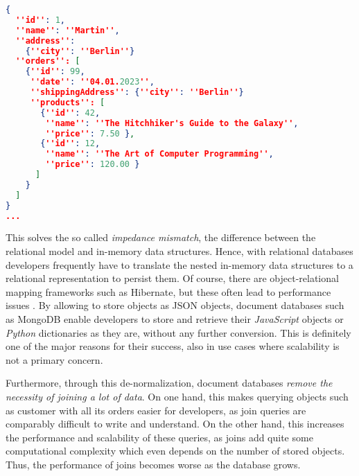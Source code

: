 \begin{lstlisting}[language=JSON, caption=JSON Document, captionpos=b, label=lst:JSONDocument]
{
  ''id'': 1,
  ''name'': ''Martin'',
  ''address'': 
    {''city'': ''Berlin''}
  ''orders'': [
    {''id'': 99,
     ''date'': ''04.01.2023'',
     ''shippingAddress'': {''city'': ''Berlin''}
     ''products'': [
       {''id'': 42,
        ''name'': ''The Hitchhiker's Guide to the Galaxy'',
        ''price'': 7.50 },
       {''id'': 12,
        ''name'': ''The Art of Computer Programming'',
        ''price'': 120.00 }
      ]
    }
  ]
}
...
\end{lstlisting}


This solves the so called \emph{impedance mismatch}, the difference between the relational model and in-memory data structures. Hence, with relational databases developers frequently have to translate the nested in-memory data structures to a relational representation to persist them. Of course, there are object-relational mapping frameworks such as Hibernate, but these often lead to performance issues \cite{NoSQLDistilled}. By allowing to store objects as JSON objects, document databases such as MongoDB enable developers to store and retrieve their \emph{JavaScript} objects or \emph{Python} dictionaries as they are, without any further conversion. This is definitely one of the major reasons for their success, also in use cases where scalability is not a primary concern.\par
Furthermore, through this de-normalization, document databases \emph{remove the necessity of joining a lot of data}. On one hand, this makes querying objects such as customer with all its orders easier for developers, as join queries are comparably difficult to write and understand. On the other hand, this increases the performance and scalability of these queries, as joins add quite some computational complexity which even depends on the number of stored objects. Thus, the performance of joins becomes worse as the database grows.\par
